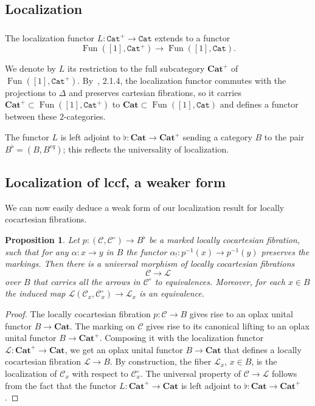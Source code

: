 \documentclass[12pt]{amsart}%
\newtheorem{prp}[subsubsection]{Proposition}
\newcommand{\Cat}{\mathtt{Cat}}
\newcommand{\bfCat}{\mathbf{Cat}}
\newcommand{\eq}{\mathit{eq}}
\newcommand{\Fun}{\operatorname{Fun}}
\newcommand{\cC}{\mathcal{C}}
\newcommand{\cL}{\mathcal{L}}
\begin{document}
\subsection{Localization}
\subsubsection{}

The localization functor $L:\Cat^+\to\Cat$ extends to a functor 
$$
\Fun([1],\Cat^+)\to\Fun([1],\Cat).
$$

We denote by $L$ its restriction to the full subcategory
$\bfCat^+$ of  $\Fun([1],\Cat^+)$.
By~\cite{H.L}, 2.1.4, the localization functor commutes with the projections to $\Delta$ and preserves  cartesian fibrations, so it  carries $\bfCat^+\subset\Fun([1],\Cat^+)$ to $\bfCat\subset
\Fun([1],\Cat)$ and
defines a functor between these $2$-categories.

The functor $L$ is left adjoint to $\flat:\bfCat\to\bfCat^+$
sending a category $B$ to the pair $B^\flat=(B,B^\eq)$; this 
reflects the universality of localization.
 


\subsection{Localization of lccf, a weaker form}
We can now easily deduce a weak form of our localization result for
locally cocartesian fibrations.
 
\begin{prp}
\label{prp:lccfloc}
Let $p:(\cC,\cC^\circ)\to B^\flat$ be a marked locally cocartesian fibration, such that for any $\alpha:x\to y$ in $B$ the functor
$\alpha_!:p^{-1}(x)\to p^{-1}(y)$ preserves the markings. Then 
there is a universal morphism of locally cocartesian fibrations
$$
\cC\to\cL
$$
over $B$
that carries all the arrows in $\cC^\circ$ to equivalences. Moreover,
for each $x\in B$ the induced map $\cL(\cC_x,\cC^\circ_x)\to\cL_x$ is an equivalence.
\end{prp}
\begin{proof}
The locally cocartesian fibration $p:\cC\to B$ gives rise to an oplax unital functor $B\to \bfCat$. The marking on $\cC$ gives rise to its canonical lifting to an oplax unital functor $B\to\bfCat^+$. Composing
it with the localization functor $\cL:\bfCat^+\to\bfCat$, we get an oplax 
unital functor $B\to\bfCat$ that defines a locally cocartesian fibration  
$\cL\to B$. By construction, the fiber $\cL_x$, $x\in B$, 
is the localization of $\cC_x$ with respect to $\cC_x^\circ$.
The universal property of $\cC\to\cL$ 
follows from the fact that the functor $L:\bfCat^+\to\bfCat$ is left adjoint to $\flat:\bfCat\to\bfCat^+$.
 
\end{proof}
\end{document}
